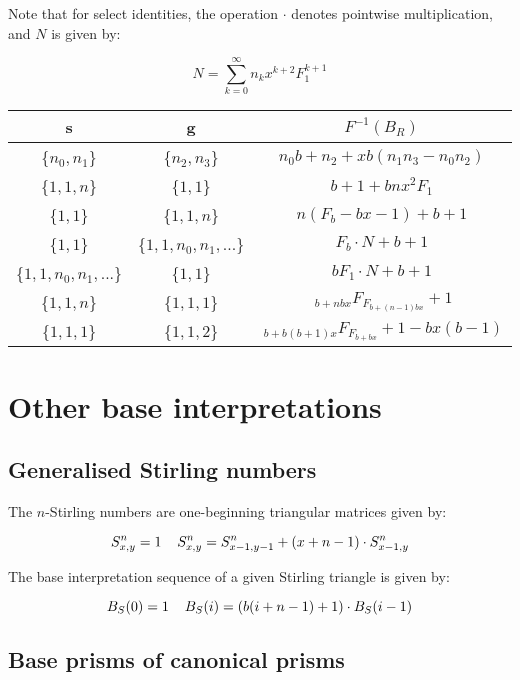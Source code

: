 \documentclass{article}
\begin{document}
\noindent Note that for select identities, the operation $\cdot$ denotes pointwise multiplication, and $N$ is given by:

$$N = \sum_{k=0}^{\infty} n_k x^{k+2} F_1^{k+1}$$

\begin{center}
\begin{tabular}{|c|c|c|}
\hline
s & g & $F^{-1}(B_R)$\\
\hline
\{$n_0, n_1$\} & \{$n_2, n_3$\} & $n_0 b + n_2 + xb(n_1 n_3 - n_0 n_2)$\\
\hline
\{$1,1,n$\} & \{$1,1$\} & $b+1 + bnx^2 F_1$\\
\hline
\{$1,1$\} & \{$1,1,n$\} & $n(F_b - bx - 1) + b + 1$\\
\hline
\{$1, 1$\} & \{$1,1,n_0,n_1,...$\} & $F_b \cdot N + b + 1$\\
\hline
\{$1, 1, n_0, n_1, ...$\} & \{$1,1$\} & $bF_1 \cdot N + b + 1$\\
\hline
\{$1, 1, n$\} & \{$1,1,1$\} & $~_{b + nbx}F_{F_{b + (n-1)bx}}+1$\\
\hline
\{$1, 1, 1$\} & \{$1,1,2$\} & $~_{b + b(b+1)x}F_{F_{b + bx}}+ 1 - bx(b-1)$\\
\hline
\end{tabular}
\end{center}

\section{Other base interpretations}

\subsection{Generalised Stirling numbers}

The $n$-Stirling numbers are one-beginning triangular matrices given by:

$$S_{x,y}^n = 1 \hspace{4mm} S_{x,y}^n = S_{x-1,y-1}^n + (x+n-1) \cdot S_{x-1,y}^n$$

\noindent The base interpretation sequence of a given Stirling triangle is given by:

$$B_S (0) = 1 \hspace{4mm} B_S(i) = (b(i+n-1) + 1) \cdot B_S(i-1)$$

\subsection{Base prisms of canonical prisms}
\end{document}
